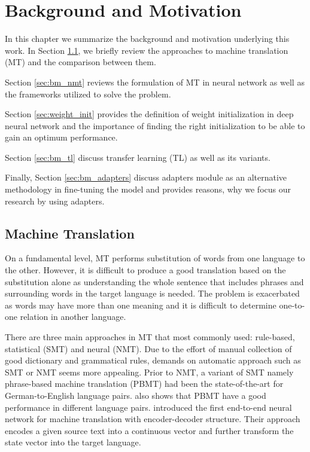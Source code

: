 \chapter{Background and Motivation}

In this chapter we summarize the background and motivation underlying this work. In Section \ref{sec:bm_smt}, we briefly review the approaches to machine translation (MT) and the comparison between them.

Section \ref{sec:bm_nmt} reviews the formulation of MT in neural network as well as the frameworks utilized to solve the problem.

Section \ref{sec:weight_init} provides the definition of weight initialization in deep neural network and the importance of finding the right initialization to be able to gain an optimum performance.

Section \ref{sec:bm_tl} discuss transfer learning (TL) as well as its variants.

Finally, Section \ref{sec:bm_adapters} discuss adapters module as an alternative methodology in fine-tuning the model and provides reasons, why we focus our research by using adapters.

\section{Machine Translation}
\label{sec:bm_smt}
On a fundamental level, MT performs substitution of words from one language to the other. However, it is difficult to produce a good translation based on the substitution alone as understanding the whole sentence that includes phrases and surrounding words in the target language is needed. The problem is exacerbated as words may have more than one meaning and it is difficult to determine one-to-one relation in another language.

There are three main approaches in MT that most commonly used: rule-based, statistical (SMT) and neural (NMT). Due to the effort of manual collection of good dictionary and grammatical rules, demands on automatic approach such as SMT or NMT seems more appealing.
Prior to NMT, a variant of SMT namely phrase-based machine translation (PBMT) had been the state-of-the-art for German-to-English language pairs. \cite{bojar2015proceeding} also shows that PBMT have a good performance in different language pairs. \cite{blunsom2013recurrent} introduced the first end-to-end neural network for machine translation with encoder-decoder structure. Their approach encodes a given source text into a continuous vector and further transform the state vector into the target language.

